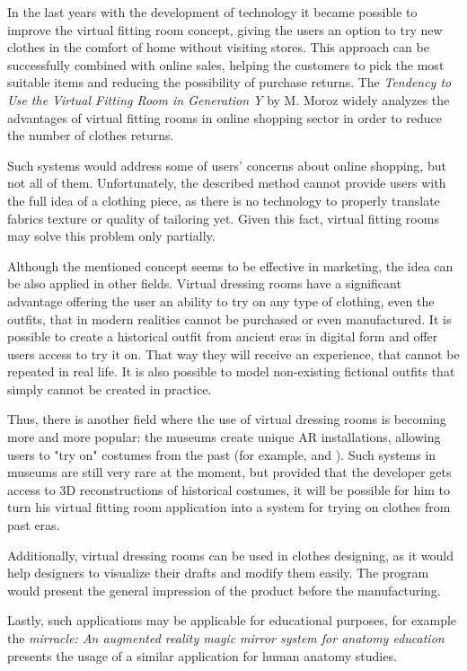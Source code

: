 \documentclass[a4paper]{report}
\begin{document}
In the last years with the development of technology it became possible to improve the virtual fitting room concept, giving the users an option to try new clothes in the comfort of home without visiting stores. This approach can be successfully combined with online sales, helping the customers to pick the most suitable items and reducing the possibility of purchase returns. The \textit{Tendency to Use the Virtual Fitting Room in Generation Y} by M. Moroz \cite{VFR_management} widely analyzes the advantages of virtual fitting rooms in online shopping sector in order to reduce the number of clothes returns. 

Such systems would address some of users’ concerns about online shopping, but not all of them. Unfortunately, the described method cannot provide users with the full idea of a clothing piece, as there is no technology to properly translate fabrics texture or quality of tailoring yet. Given this fact, virtual fitting rooms may solve this problem only partially.

Although the mentioned concept seems to be effective in marketing, the idea can be also applied in other fields. Virtual dressing rooms have a significant advantage offering the user an ability to try on any type of clothing, even the outfits, that in modern realities cannot be purchased or even manufactured. It is possible to create a historical outfit from ancient eras in digital form and offer users access to try it on. That way they will receive an experience, that cannot be repeated in real life. It is also possible to model non-existing fictional outfits that simply cannot be created in practice.

\newpage
Thus, there is another field where the use of virtual dressing rooms is becoming more and more popular: the museums create unique AR installations, allowing users to "try on" costumes from the past (for example, \cite{museumMagicMirror} and \cite{museumVFR}). Such systems in museums are still very rare at the moment, but provided that the developer gets access to 3D reconstructions of historical costumes, it will be possible for him to turn his virtual fitting room application into a system for trying on clothes from past eras.

Additionally, virtual dressing rooms can be used in clothes designing, as it would help designers to visualize their drafts and modify them easily. The program would present the general impression of the product before the manufacturing.

Lastly, such applications may be applicable for educational purposes, for example the \textit{mirracle: An augmented reality magic mirror system for anatomy education} \cite{auMagicMirror} presents the usage of a similar application for human anatomy studies.
\end{document}
